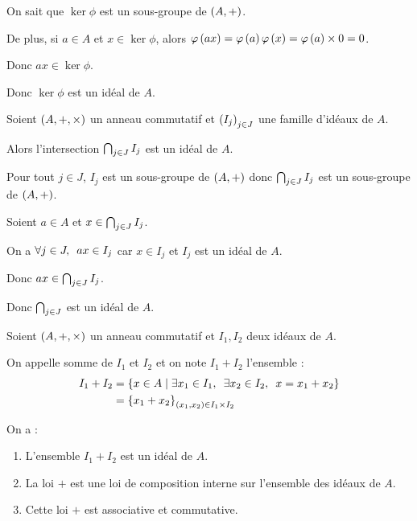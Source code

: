 \begin{dem}
On sait que \(\ker\phi\) est un sous-groupe de \(\groupe{A}\).

De plus, si \(a\in A\) et \(x\in\ker\phi\), alors \(\varphi\left(ax\right)=\varphi\left(a\right)\varphi\left(x\right)=\varphi\left(a\right)\times0=0\).

Donc \(ax\in\ker\phi\).

Donc \(\ker\phi\) est un idéal de \(A\).
\end{dem}

\begin{prop}
Soient \(\anneau{A}\) un anneau commutatif et \(\left(I_j\right)_{j\in J}\) une famille d'idéaux de \(A\).

Alors l'intersection \(\bigcap_{j\in J}I_j\) est un idéal de \(A\).
\end{prop}

\begin{dem}
Pour tout \(j\in J\), \(I_j\) est un sous-groupe de \(\groupe{A}\) donc \(\bigcap_{j\in J}I_j\) est un sous-groupe de \(\groupe{A}\).

Soient \(a\in A\) et \(x\in\bigcap_{j\in J}I_j\).

On a \(\quantifs{\forall j\in J}ax\in I_j\) car \(x\in I_j\) et \(I_j\) est un idéal de \(A\).

Donc \(ax\in\bigcap_{j\in J}I_j\).

Donc \(\bigcap_{j\in J}\) est un idéal de \(A\).
\end{dem}

\begin{defprop}
Soient \(\anneau{A}\) un anneau commutatif et \(I_1,I_2\) deux idéaux de \(A\).

On appelle somme de \(I_1\) et \(I_2\) et on note \(I_1+I_2\) l'ensemble : \[\begin{aligned}
I_1+I_2&=\accol{x\in A\tq\quantifs{\exists x_1\in I_1;\exists x_2\in I_2}x=x_1+x_2} \\
&=\accol{x_1+x_2}_{\paren{x_1,x_2}\in I_1\times I_2}
\end{aligned}\]

On a :

\begin{enumerate}
\item L'ensemble \(I_1+I_2\) est un idéal de \(A\). \\

\item La loi \(+\) est une loi de composition interne sur l'ensemble des idéaux de \(A\). \\

\item Cette loi \(+\) est associative et commutative.
\end{enumerate}
\end{defprop}

